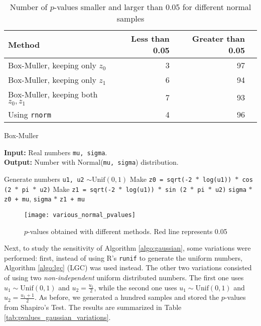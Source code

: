 \documentclass[letterpaper, 10 pt, conference]{article}
\begin{document}
\begin{table}
	\centering
	\caption{Number of $p$-values smaller and larger than 0.05 for different normal samples}
	\begin{tabular}{l r r r}
		\hline
		 Method &Less than 0.05 & Greater than 0.05 \\ 
		\hline
		Box-Muller, keeping only $z_0$ & 3 & 97 \\ 
		Box-Muller, keeping only $z_1$ &  6 & 94 \\ 
		Box-Muller, keeping both $z_0, z_1$ &  7 & 93 \\
		Using \texttt{rnorm} & 4 & 96 \\
		\hline
	\end{tabular}
	\label{tab:pvalues_gaussian}
\end{table}

\begin{algorithm}
	\caption{Box-Muller}
	\begin{flushleft}
		\textbf{Input: } Real numbers \texttt{mu, sigma}.
		\\ \textbf{Output: } Number with $\mathrm{Normal}$(\texttt{mu, sigma}) distribution.
	\end{flushleft}
	
	\begin{algorithmic}[1]
		\State Generate numbers \texttt{u1, u2} $\sim \mathrm{Unif}(0,1)$
		\State Make \texttt{z0 = sqrt(-2 $\ast$ log(u1)) $\ast$ cos (2 $\ast$ pi $\ast$ u2)} 
		\State Make \texttt{z1 = sqrt(-2 $\ast$ log(u1)) $\ast$ sin (2 $\ast$ pi $\ast$ u2)} 
		\State \Return \texttt{sigma} $\ast$ \texttt{z0 + mu}, \texttt{sigma} $\ast$ \texttt{z1 + mu}
	\end{algorithmic}
	\label{algo:gaussian}
\end{algorithm}

\begin{figure}
\centering
\texttt{[image: various\_normal\_pvalues]}	
\caption{$p$-values obtained with different methods. Red line represents 0.05}
\label{fig:pvalues_gaussian}
\end{figure}

Next, to study the sensitivity of Algorithm \ref{algo:gaussian}, some variations were performed: first, instead of using R's \texttt{runif} to generate the uniform numbers, Algorithm \ref{algo:lgc} (\textsc{LGC}) was used instead. The other two variations consisted of using two \textit{non-independent} uniform distributed numbers. The first one uses $u_1 \sim \mathrm{Unif}(0,1)$ and  $u_2 = \frac{u_1}{2}$, while the second one uses $u_1 \sim \mathrm{Unif}(0,1)$ and  $u_2 = \frac{u_1 + 1}{2}$. As before, we generated a hundred samples and stored the $p$-values from Shapiro's Test. The results are summarized in Table \ref{tab:pvalues_gaussian_variations}.
\end{document}
